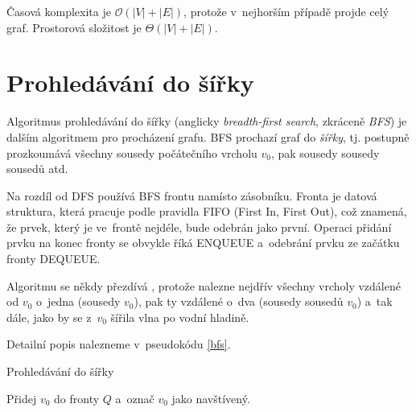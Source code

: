 \documentclass[12pt]{report}			%
\begin{document}
			
			
			Časová komplexita je $\mathcal{O}(|V| + |E|)$, protože v~nejhorším případě projde celý graf. Prostorová složitost je $\Theta(|V| + |E|)$.
			
			\section{Prohledávání do šířky}
			Algoritmus prohledávání do šířky (anglicky \emph{breadth-first search}, zkráceně \emph{BFS}) je dalším algoritmem pro procházení grafu. BFS prochazí graf do \emph{šířky}, tj. postupně prozkoumává všechny sousedy počátečního vrcholu $v_0$, pak sousedy sousedy sousedů  atd. %

Na rozdíl od DFS používá BFS frontu namísto zásobníku. Fronta je datová struktura, která pracuje podle pravidla FIFO (First In, First Out), což znamená, že prvek, který je ve~frontě nejdéle, bude odebrán jako první. Operaci přidání prvku na konec fronty se obvykle říká ENQUEUE a~odebrání prvku ze začátku fronty DEQUEUE.

Algoritmu se někdy přezdívá , protože nalezne nejdřív všechny vrcholy vzdálené od $v_0$ o~jedna (sousedy $v_0$), pak ty vzdálené o~dva (sousedy sousedů $v_0$) a~tak dále, jako by se z~$v_0$ šířila vlna po vodní hladině.

Detailní popis nalezneme v~pseudokódu \ref{bfs}.



\begin{algorithm}

			    \caption{Prohledávání do šířky}
			    \label{bfs}
  				Přidej $v_0$ do fronty $Q$ a~označ $v_0$ jako navštívený.
  				
				
				
				\end{algorithm}
\end{document}
